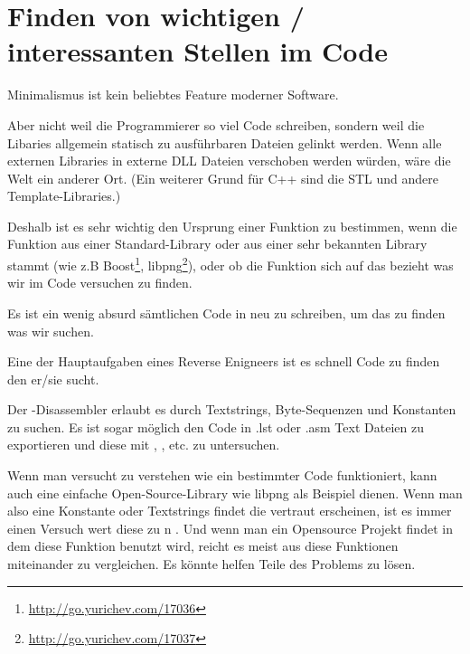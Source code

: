 \chapter{Finden von wichtigen / interessanten Stellen im Code}

Minimalismus ist kein beliebtes Feature moderner Software.


Aber nicht weil die Programmierer so viel Code schreiben, sondern weil die Libaries
allgemein statisch zu ausf\"uhrbaren Dateien gelinkt werden. Wenn alle externen
Libraries in externe DLL Dateien verschoben werden w\"urden, w\"are die Welt ein
anderer Ort. (Ein weiterer Grund f\"ur C++ sind die \ac{STL} und andere Template-Libraries.)

\newcommand{\FOOTNOTEBOOST}{\footnote{\url{http://go.yurichev.com/17036}}}
\newcommand{\FOOTNOTELIBPNG}{\footnote{\url{http://go.yurichev.com/17037}}}

Deshalb ist es sehr wichtig den Ursprung einer Funktion zu bestimmen, wenn die
Funktion aus einer Standard-Library oder aus einer sehr bekannten Library stammt
(wie z.B Boost\FOOTNOTEBOOST, libpng\FOOTNOTELIBPNG), oder ob die Funktion sich
auf das bezieht was wir im Code versuchen zu finden.

Es ist ein wenig absurd s\"amtlichen Code in \CCpp neu zu schreiben, um das zu
finden was wir suchen.

Eine der Hauptaufgaben eines Reverse Enigneers ist es schnell Code zu finden den
er/sie sucht.

\myindex{\GrepUsage}

Der \IDA-Disassembler erlaubt es durch Textstrings, Byte-Sequenzen und Konstanten
zu suchen.  Es ist sogar m\"oglich den Code in .lst oder .asm Text Dateien zu
exportieren und diese mit , , etc. zu untersuchen.

Wenn man versucht zu verstehen wie ein bestimmter Code funktioniert, kann auch
eine einfache Open-Source-Library wie libpng als Beispiel dienen.
Wenn man also eine Konstante oder Textstrings findet die vertraut erscheinen, ist
es immer einen Versuch wert diese zu n .
Und wenn man ein Opensource Projekt findet in dem diese Funktion benutzt wird, 
reicht es meist aus diese Funktionen miteinander zu vergleichen.
Es k\"onnte helfen Teile des Problems zu l\"osen.


